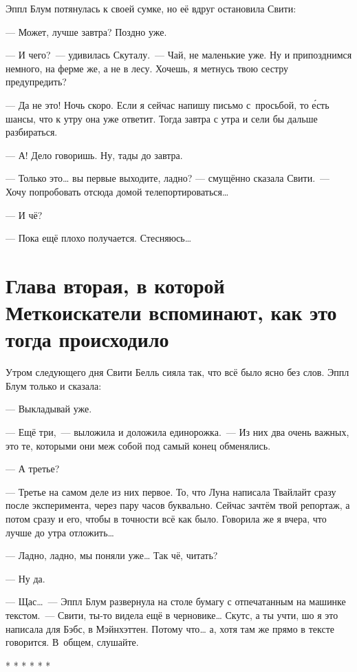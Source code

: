 \documentclass[fontsize=11pt,a5paper,titlepage=firstcover]{scrbook}
\begin{document}
Эппл Блум потянулась к своей сумке, но её вдруг остановила Свити:

--- Может, лучше завтра? Поздно уже.

--- И чего?~--- удивилась Скуталу.~--- Чай, не маленькие уже. Ну и припозднимся немного, на ферме же, а не в лесу. Хочешь, я метнусь твою сестру предупредить?

--- Да не это! Ночь скоро. Если я сейчас напишу письмо с~просьбой, то е́сть шансы, что к утру она уже ответит. Тогда завтра с утра и сели бы дальше разбираться.

--- А! Дело говоришь. Ну, тады до завтра.

--- Только это{\ldots} вы первые выходите, ладно? --- смущённо сказала Свити.~--- Хочу попробовать отсюда домой телепортироваться{\ldots}

--- И чё?

--- Пока ещё плохо получается. Стесняюсь{\ldots}



\chapter*{Глава вторая, в которой Меткоискатели вспоминают, как это тогда происходило}

Утром следующего дня Свити Белль сияла так, что всё было ясно без слов. Эппл Блум только и сказала:

--- Выкладывай уже.

--- Ещё три,~--- выложила и доложила единорожка.~--- Из них два очень важных, это те, которыми они меж собой под самый конец обменялись.

--- А третье?

--- Третье на самом деле из них первое. То, что Луна написала Твайлайт сразу после эксперимента, через пару часов буквально. Сейчас зачтём твой репортаж, а потом сразу и его, чтобы в точности всё как было. Говорила же я вчера, что лучше до утра отложить{\ldots}

--- Ладно, ладно, мы поняли уже{\ldots} Так чё, читать?

--- Ну да.

--- Щас{\ldots}~--- Эппл Блум развернула на столе бумагу с отпечатанным на машинке текстом.~--- Свити, ты-то видела ещё в черновике{\ldots} Скутс, а ты учти, шо я это написала для Бэбс, в Мэйнхэттен. Потому что{\ldots} а, хотя там же прямо в тексте говорится. В~общем, слушайте.
\begin{center}
	* * * * * *
\end{center}
\end{document}
